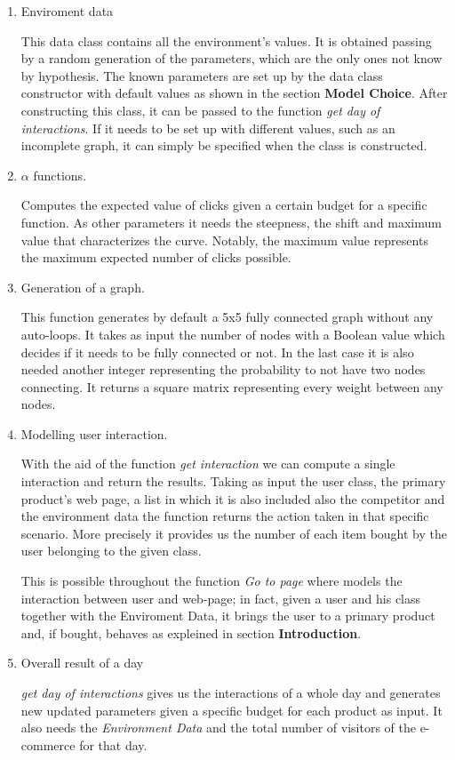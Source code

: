  \begin{enumerate}
     \item Enviroment data
     
     This data class contains all the environment's values. It is obtained passing by a random generation of the parameters, which are the only ones not know by hypothesis. The known parameters are set up by the data class constructor with default values as shown in the section \textbf{Model Choice}. After constructing this class, it can be passed to the function  \textit{get day of interactions}. If it needs to be set up with different values, such as an incomplete graph, it can simply be specified when the class is constructed.
    
     \item $\alpha$ functions.
     
     Computes the expected value of clicks given a certain budget for a specific function. As other parameters it needs the steepness, the shift and maximum value that characterizes the curve. Notably, the maximum value represents the maximum expected number of clicks possible.
  
    \item Generation of a graph.
    
    This function generates by default a 5x5 fully connected graph without any auto-loops. It takes as input the number of nodes with a Boolean value which decides if it needs to be fully connected or not. In the last case it is also needed another integer representing the probability to not have two nodes connecting. It returns a square matrix representing every weight between any nodes.
   
    \item Modelling user interaction.
    
    With the aid of the function \textit{get interaction} we can compute a single interaction and return the results. Taking as input the user class, the primary product's web page, a list in which it is also included also the competitor and the environment data the function returns the action taken in that specific scenario. More precisely it provides us the number of each item bought by the user belonging to the given class.
    
    This is possible throughout the function \textit{Go to page} where models the interaction between user and web-page; in fact, given a user and his class together with the Enviroment Data, it brings the user to a primary product and, if bought, behaves as expleined in section \textbf{Introduction}.
    
    \item Overall result of a day
    
    \textit{get day of interactions} gives us the interactions of a whole day and generates new updated parameters given a specific budget for each product as input. It also needs the \textit{Environment Data} and the total number of visitors of the e-commerce for that day.
    
\end{enumerate}
